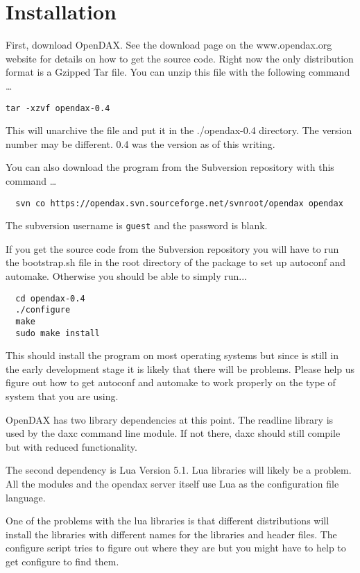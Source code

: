 \section{Installation}

First, download OpenDAX. See the download page on the www.opendax.org website for details on how to get the source code.  Right now the only distribution format is a Gzipped Tar file.  You can unzip this file with the following command \ldots

\verb|tar -xzvf opendax-0.4|

This will unarchive the file and put it in the ./opendax-0.4 directory.  The version number may be different.  0.4 was the version as of this writing.

You can also download the program from the Subversion repository with this command \ldots

\begin{verbatim}
  svn co https://opendax.svn.sourceforge.net/svnroot/opendax opendax
\end{verbatim}
The subversion username is \texttt{guest} and the password is blank.

If you get the source code from the Subversion repository you will have to run the bootstrap.sh file in the root directory of the package to set up autoconf and automake. Otherwise you should be able to simply run...

\begin{verbatim}
  cd opendax-0.4
  ./configure
  make
  sudo make install 
\end{verbatim} 

This should install the program on most operating systems but since \opendax is still in the early development stage it is likely that there will be problems. Please help us figure out how to get autoconf and automake to work properly on the type of system that you are using.

OpenDAX has two library dependencies at this point. The readline library is used by the daxc command line module. If not there, daxc should still compile but with reduced functionality.

The second dependency is Lua Version 5.1. Lua libraries will likely be a problem. All the modules and the opendax server itself use Lua as the configuration file language.

One of the problems with the lua libraries is that different distributions will install the libraries with different names for the libraries and header files. The configure script tries to figure out where they are but you might have to help to get configure to find them.

